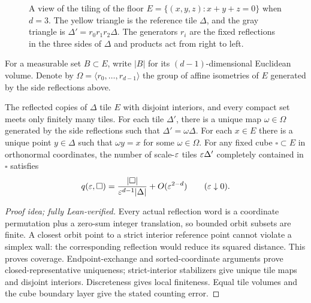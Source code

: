 \documentclass[11pt,letterpaper]{article}
\begin{document}
\begin{figure}[!htbp]
{}
      \caption{A view of the tiling of the floor $E=\{(x,y,z):x+y+z=0\}$ when $d=3$. The yellow triangle is the reference tile $\Delta$, and the gray triangle is $\Delta'=r_0r_1r_2\Delta$. The generators $r_i$ are the fixed reflections in the three sides of $\Delta$ and products act from right to left.}
      \label{fig:triangles}
\end{figure}

For a measurable set $B\subset E$, write $|B|$ for its $(d-1)$-dimensional Euclidean volume. Denote by $\Omega=\langle r_0,\ldots,r_{d-1}\rangle$ the group of affine isometries of $E$ generated by the side reflections above.

\begin{proposition}\label{prop:tiling}
      The reflected copies of $\Delta$ tile $E$ with disjoint interiors, and every compact set meets only finitely many tiles. For each tile $\Delta'$, there is a unique map $\omega\in \Omega$ generated by the side reflections such that $\Delta'=\omega\Delta$. For each $x\in E$ there is a unique point $y\in\Delta$ such that $\omega y=x$ for some $\omega\in \Omega$. For any fixed cube $\square\subset E$ in orthonormal coordinates, the number of scale-$\varepsilon$ tiles $\varepsilon\Delta'$ completely contained in $\square$ satisfies
      \begin{equation}\label{eq:tile-number}
            q(\varepsilon,\square)=\frac{|\square|}{\varepsilon^{d-1}|\Delta|}+O(\varepsilon^{2-d})\qquad(\varepsilon\downarrow0).
      \end{equation}
\end{proposition}

\begin{proof}[Proof idea; fully Lean-verified]
Every actual reflection word is a coordinate permutation plus a zero-sum integer translation, so bounded orbit subsets are finite. A closest orbit point to a strict interior reference point cannot violate a simplex wall: the corresponding reflection would reduce its squared distance. This proves coverage. Endpoint-exchange and sorted-coordinate arguments prove closed-representative uniqueness; strict-interior stabilizers give unique tile maps and disjoint interiors. Discreteness gives local finiteness. Equal tile volumes and the cube boundary layer give the stated counting error.
\end{proof}
\end{document}
